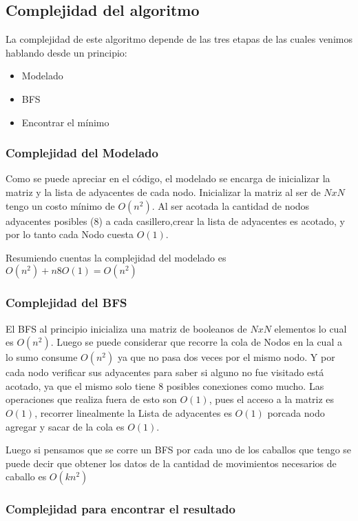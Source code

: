 \subsection{Complejidad del algoritmo}
La complejidad de este algoritmo depende de las tres etapas de las cuales venimos hablando desde un principio:

\begin{itemize}
	\item Modelado
	\item BFS
	\item Encontrar el m\'inimo
\end{itemize}

\subsubsection{Complejidad del Modelado}

Como se puede apreciar en el c\'odigo, el modelado se encarga de inicializar la matriz y la lista de adyacentes de cada nodo.
Inicializar la matriz al ser de $NxN$ tengo un costo m\'inimo de $O(n^2)$.
Al ser acotada la cantidad de nodos adyacentes posibles (8) a cada casillero,crear la lista de adyacentes es acotado, y por lo tanto cada Nodo cuesta $O(1)$.

Resumiendo cuentas la complejidad del modelado es $O(n^2) + n 8 O(1) = O(n^2)$


\subsubsection{Complejidad del BFS}

El BFS al principio inicializa una matriz de booleanos de $NxN$ elementos lo cual es $O(n^2)$.
Luego se puede considerar que recorre la cola de Nodos en la cual a lo sumo consume $O(n^2)$ ya que no pasa dos veces por el mismo nodo. Y por cada nodo verificar sus adyacentes para saber si alguno no fue visitado est\'a acotado, ya que el mismo solo tiene 8 posibles conexiones como mucho. Las operaciones que realiza fuera de esto son $O(1)$, pues el acceso a la matriz es $O(1)$, recorrer linealmente la Lista de adyacentes es $O(1)$ porcada nodo agregar y sacar de la cola es $O(1)$.

Luego si pensamos que se corre un BFS por cada uno de los caballos que tengo se puede decir que obtener los datos de la cantidad de movimientos necesarios de caballo es $O(k n^2)$


\subsubsection{Complejidad para encontrar el resultado}

